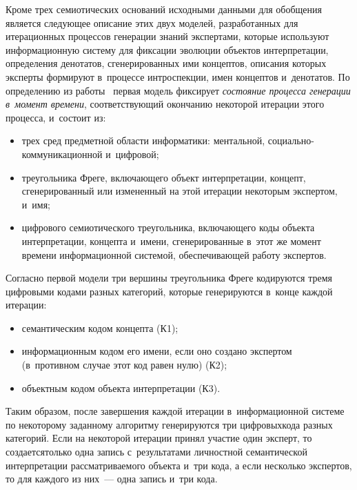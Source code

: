 {\begin{multicols}{2}
      Кроме трех семиотических оснований исходными данными для обобщения является 
следующее описание этих двух моделей, разработанных для итерационных процессов 
генерации знаний экспертами, которые используют информационную систему для 
фиксации эволюции объектов интерпретации, определения денотатов, сгенерированных 
ими концептов, описания которых эксперты формируют в~процессе интроспекции, имен 
концептов и~денотатов. По определению из работы~\cite{16-zat} первая модель фиксирует 
\textit{состояние процесса генерации в~момент времени}, соответствующий окончанию 
некоторой итерации этого процесса, и~состоит из:
      \begin{itemize}
\item трех сред предметной области информатики: ментальной,  
со\-ци\-аль\-но-ком\-му\-ни\-ка\-ци\-он\-ной и~цифровой;
\item треугольника Фреге, включающего объект интерпретации, концепт, 
сгенерированный или измененный на этой итерации некоторым экспертом, и~имя;
\item цифрового семиотического треугольника, включающего коды объекта 
интерпретации, концепта и~имени, сгенерированные в~этот же момент времени 
информационной системой, обеспечивающей работу экспертов.
\end{itemize}

      Согласно первой модели три вершины треугольника Фреге кодируются тремя 
цифровыми кодами разных категорий, которые генерируются в~конце каждой итерации:
      \begin{itemize}
\item семантическим кодом концепта (К1);
\item информационным кодом его имени, если оно создано экспертом 
(в~противном случае этот код равен нулю) (К2);
\item объектным кодом объекта интерпретации (К3).
\end{itemize}

      Таким образом, после завершения каждой итерации в~информационной системе по 
некоторому заданному алгоритму генерируются три цифровых\linebreak кода разных категорий. Если 
на некоторой итерации принял участие один эксперт, то создается\linebreak только одна запись 
с~результатами личностной семантической интерпретации рассматриваемого объекта и~три 
кода, а если несколько экспертов, то для каж\-до\-го из них~--- одна запись и~три кода.
      

\end{multicols}}
